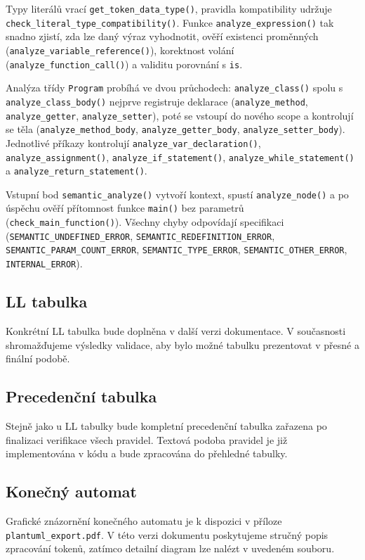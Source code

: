 \documentclass[a4paper,12pt]{article}
\begin{document}
Typy literálů vrací \texttt{get\_token\_data\_type()}, pravidla kompatibility udržuje \texttt{check\_literal\_type\_compatibility()}. Funkce \texttt{analyze\_expression()} tak snadno zjistí, zda lze daný výraz vyhodnotit, ověří existenci proměnných (\texttt{analyze\_variable\_reference()}), korektnost volání (\texttt{analyze\_function\_call()}) a validitu porovnání s \texttt{is}.

Analýza třídy \texttt{Program} probíhá ve dvou průchodech: \texttt{analyze\_class()} spolu s \texttt{analyze\_class\_body()} nejprve registruje deklarace (\texttt{analyze\_method}, \texttt{analyze\_getter}, \texttt{analyze\_setter}), poté se vstoupí do nového scope a kontrolují se těla (\texttt{analyze\_method\_body}, \texttt{analyze\_getter\_body}, \texttt{analyze\_setter\_body}). Jednotlivé příkazy kontrolují \texttt{analyze\_var\_declaration()}, \texttt{analyze\_assignment()}, \texttt{analyze\_if\_statement()}, \texttt{analyze\_while\_statement()} a \texttt{analyze\_return\_statement()}.

Vstupní bod \texttt{semantic\_analyze()} vytvoří kontext, spustí \texttt{analyze\_node()} a po úspěchu ověří přítomnost funkce \texttt{main()} bez parametrů (\texttt{check\_main\_function()}). Všechny chyby odpovídají specifikaci (\texttt{SEMANTIC\_UNDEFINED\_ERROR}, \texttt{SEMANTIC\_REDEFINITION\_ERROR}, \texttt{SEMANTIC\_PARAM\_COUNT\_ERROR}, \texttt{SEMANTIC\_TYPE\_ERROR}, \texttt{SEMANTIC\_OTHER\_ERROR}, \texttt{INTERNAL\_ERROR}).

\subsection{LL tabulka}
Konkrétní LL tabulka bude doplněna v další verzi dokumentace. V současnosti shromažďujeme výsledky validace, aby bylo možné tabulku prezentovat v přesné a finální podobě.

\subsection{Precedenční tabulka}
Stejně jako u LL tabulky bude kompletní precedenční tabulka zařazena po finalizaci verifikace všech pravidel. Textová podoba pravidel je již implementována v kódu a bude zpracována do přehledné tabulky.

\subsection{Konečný automat}
Grafické znázornění konečného automatu je k dispozici v příloze \texttt{plantuml\_export.pdf}. V této verzi dokumentu poskytujeme stručný popis zpracování tokenů, zatímco detailní diagram lze nalézt v uvedeném souboru.
\end{document}
